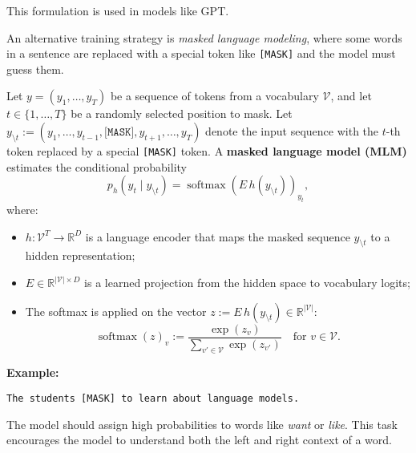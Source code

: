 This formulation is used in models like GPT.


An alternative training strategy is \emph{masked language modeling}, where some words in a sentence are replaced with a special token like \texttt{[MASK]} and the model must guess them.



\begin{definition}
Let \( y = (y_1, \dots, y_T) \) be a sequence of tokens from a vocabulary \( \mathcal{V} \), and let \( t \in \{1, \dots, T\} \) be a randomly selected position to mask.
Let \( y_{\setminus t} := (y_1, \dots, y_{t-1}, \texttt{[MASK]}, y_{t+1}, \dots, y_T) \) denote the input sequence with the \( t \)-th token replaced by a special \texttt{[MASK]} token.
A \textbf{masked language model (MLM)} estimates the conditional probability
\[
p_h(y_t \mid y_{\setminus t}) = \operatorname{softmax}(E\, h(y_{\setminus t}))_{y_t},
\]
where:
\begin{itemize}
    \item \( h \colon \mathcal{V}^T \to \mathbb{R}^D \) is a language encoder that maps the masked sequence \( y_{\setminus t} \) to a hidden representation;
    \item \( E \in \mathbb{R}^{|\mathcal{V}| \times D} \) is a learned projection from the hidden space to vocabulary logits;
    \item The softmax is applied on the vector \( z := E\, h(y_{\setminus t}) \in \mathbb{R}^{|\mathcal{V}|} \): \[ \operatorname{softmax}(z)_v:= \frac{\exp(z_v)}{\sum\limits_{v' \in \mathcal{V}} \exp(z_{v'})} \quad \text{for } v \in \mathcal{V}.
    \]\end{itemize}
\end{definition}


\textbf{Example:}

\texttt{The students [MASK] to learn about language models.}

The model should assign high probabilities to words like \textit{want} or \textit{like}. This task encourages the model to understand both the left and right context of a word.